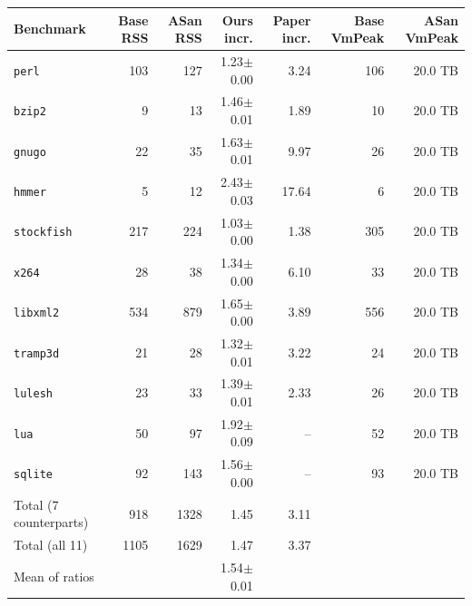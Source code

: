 \begin{tabular}{lrrrrrr}
\toprule
Benchmark & Base RSS & ASan RSS & Ours incr. & Paper incr. & Base VmPeak & ASan VmPeak \\
\midrule
\texttt{perl} & 103 & 127 & 1.23$\pm$0.00 & 3.24 & 106 & 20.0 TB \\
\texttt{bzip2} & 9 & 13 & 1.46$\pm$0.01 & 1.89 & 10 & 20.0 TB \\
\texttt{gnugo} & 22 & 35 & 1.63$\pm$0.01 & 9.97 & 26 & 20.0 TB \\
\texttt{hmmer} & 5 & 12 & 2.43$\pm$0.03 & 17.64 & 6 & 20.0 TB \\
\texttt{stockfish} & 217 & 224 & 1.03$\pm$0.00 & 1.38 & 305 & 20.0 TB \\
\texttt{x264} & 28 & 38 & 1.34$\pm$0.00 & 6.10 & 33 & 20.0 TB \\
\texttt{libxml2} & 534 & 879 & 1.65$\pm$0.00 & 3.89 & 556 & 20.0 TB \\
\texttt{tramp3d} & 21 & 28 & 1.32$\pm$0.01 & 3.22 & 24 & 20.0 TB \\
\texttt{lulesh} & 23 & 33 & 1.39$\pm$0.01 & 2.33 & 26 & 20.0 TB \\
\texttt{lua} & 50 & 97 & 1.92$\pm$0.09 & -- & 52 & 20.0 TB \\
\texttt{sqlite} & 92 & 143 & 1.56$\pm$0.00 & -- & 93 & 20.0 TB \\
\midrule
Total (7 counterparts) & 918 & 1328 & 1.45 & 3.11 &  &  \\
Total (all 11) & 1105 & 1629 & 1.47 & 3.37 &  &  \\
Mean of ratios &  &  & 1.54$\pm$0.01 &  &  &  \\
\bottomrule
\end{tabular}
